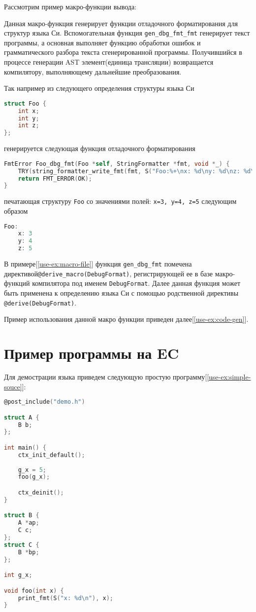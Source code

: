 Рассмотрим пример макро-функции вывода:


Данная макро-функция генерирует функции отладочного форматирования для структур языка Си.
Вспомогательная функция \verb|gen_dbg_fmt_fmt| генерирует текст программы, а основная выполняет функцию обработки ошибок и грамматического разбора текста сгенерированной программы.
Получившийся в процессе генерации AST элемент(единица трансляции) возвращается компилятору, выполняющему дальнейшие преобразования.

Так например из следующего определения структуры языка Си
\begin{lstlisting}[language=C]
struct Foo {
    int x;
    int y;
    int z;
};
\end{lstlisting}

генерируется следующая функция отладочного форматирования
\begin{lstlisting}[language=C]
FmtError Foo_dbg_fmt(Foo *self, StringFormatter *fmt, void *_) {
    TRY(string_formatter_write_fmt(fmt, S("Foo:%+\nx: %d\ny: %d\nz: %d\n%-"), self->x, self->y, self->z));
    return FMT_ERROR(OK);
}
\end{lstlisting}

печатающая структуру \verb|Foo| со значениями полей: \verb|x=3, y=4, z=5| следующим образом
\begin{lstlisting}[language=C]
Foo:
    x: 3
    y: 4
    z: 5
\end{lstlisting}

В примере[\ref{use-ex:macro-file}] функция \verb|gen_dbg_fmt| помечена директивой\newline \verb|@derive_macro(DebugFormat)|, регистрирующей ее в базе макро-функций компилятора под именем \verb|DebugFormat|.
Далее данная функция может быть применена к определению языка Си с помощью родственной директивы \verb|@derive(DebugFormat)|.

Пример использования данной макро функции приведен далее[\ref{use-ex:code-gen}].

\section{Пример программы на EC}
\label{use-ex:simple}

Для демострации языка приведем следующую простую программу[\ref{use-ex:simple-souce}]:
\begin{lstlisting}[language=C, caption={simple.ec}, label={use-ex:simple-souce}]
@post_include("demo.h")

struct A {
    B b;
};

int main() {
    ctx_init_default();
    
    g_x = 5;
    foo(g_x);

    ctx_deinit();
}

struct B {
    A *ap;
    C c;
};
struct C {
    B *bp;
};

int g_x;

void foo(int x) {
    print_fmt(S("x: %d\n"), x);
}
\end{lstlisting}

